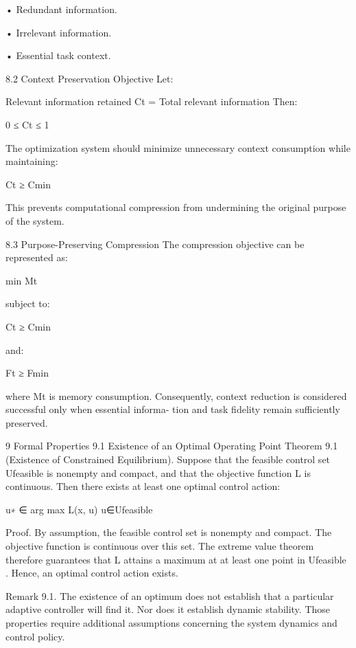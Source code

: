 \documentclass[10pt,a4paper]{article}
\begin{document}
\begin{ManuscriptText}
    • Redundant information.


  • Irrelevant information.

  • Essential task context.


8.2    Context Preservation Objective
Let:

                                 Relevant information retained
                          Ct =
                                  Total relevant information
   Then:

                                       0 ≤ Ct ≤ 1

   The optimization system should minimize unnecessary context consumption while
maintaining:

                                        Ct ≥ Cmin

   This prevents computational compression from undermining the original purpose of
the system.


8.3    Purpose-Preserving Compression
The compression objective can be represented as:

                                         min Mt

   subject to:

                                        Ct ≥ Cmin

   and:

                                        Ft ≥ Fmin

    where Mt is memory consumption.
    Consequently, context reduction is considered successful only when essential informa-
tion and task fidelity remain sufficiently preserved.


9     Formal Properties
9.1    Existence of an Optimal Operating Point
Theorem 9.1 (Existence of Constrained Equilibrium). Suppose that the feasible control
set Ufeasible is nonempty and compact, and that the objective function L is continuous.
    Then there exists at least one optimal control action:

                                   u∗ ∈ arg max L(x, u)
                                        u∈Ufeasible

Proof. By assumption, the feasible control set is nonempty and compact.
   The objective function is continuous over this set.
   The extreme value theorem therefore guarantees that L attains a maximum at at least
one point in Ufeasible .
   Hence, an optimal control action exists.


Remark 9.1. The existence of an optimum does not establish that a particular adaptive
controller will find it. Nor does it establish dynamic stability. Those properties require
additional assumptions concerning the system dynamics and control policy.



\end{ManuscriptText}
\end{document}
